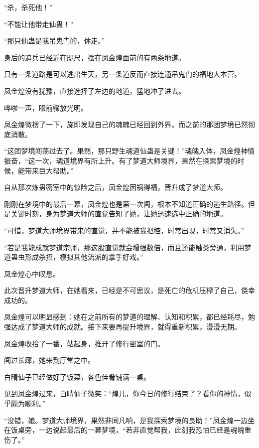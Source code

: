 
\begin{this_body}

“杀，杀死他！”

“不能让他带走仙蛊！”

“那只仙蛊是我吊鬼门的，休走。”

身后的追兵已经近在咫尺，摆在凤金煌面前的有两条地道。

只有一条道路是可以逃出生天，另一条道反而直接连通吊鬼门的福地大本营。

凤金煌没有犹豫，直接选择了左边的地道，猛地冲了进去。

哗啦一声，眼前骤放光明。

凤金煌微楞了一下，旋即发现自己的魂魄已经回到外界。而之前的那团梦境已然彻底消散。

“这团梦境闯荡过去了。果然，那只野生魂道仙蛊是关键！”魂魄入体，凤金煌神情振奋，“这一次，魂道境界有所上升。有了梦道大师境界，果然在探索梦境的时候，能带来巨大帮助。”

自从那次炼蛊密室中的惊险之后，凤金煌因祸得福，晋升成了梦道大师。

刚刚在梦境中的最后一幕，凤金煌也是第一次闯，根本不知道正确的逃生路径。但是关键时刻，身为梦道大师的直觉告知了她，让她迅速选中正确的地道。

“可惜，梦道大师境界带来的直觉，并不能被我把控，时常出现，时常又消失。”

“若是我能成就梦道宗师，那这股直觉就会增强数倍，而且还能触类旁通，利用梦道蛊虫形成杀招，模拟其他流派的拿手好戏。”

凤金煌心中叹息。

此次晋升梦道大师，在她看来，已经是不可思议，是死亡的危机压榨了自己，侥幸成功的。

凤金煌可以明显感到：她在之前所有的梦道的理解、认知和积累，都已经耗尽，勉强达成了梦道大师的成就。接下来要再提升境界，就得重新积累，漫漫无期。

凤金煌收拾了一番，站起身，推开了修行密室的门。

闯过长廊，她来到厅堂之中。

白晴仙子已经做好了饭菜，各色佳肴铺满一桌。

见到凤金煌过来，白晴仙子微笑：“煌儿，你今日的修行结束了？看你的神情，似乎颇为顺利。”

“没错，娘。梦道大师境界，果然非同凡响，是我探索梦境的良助！”凤金煌一边坐在饭桌旁，一边说起最后的一幕梦境，“若非直觉帮我，此刻我恐怕已经是魂魄重伤了。”


\end{this_body}
